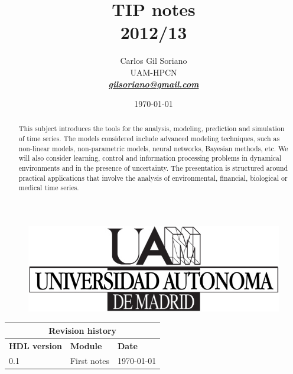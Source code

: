 \documentclass[a4paper,11pt]{article}
\begin{document}
\title{\textbf{{\LARGE TIP notes \\2012/13}}}
\author{Carlos Gil Soriano\\UAM-HPCN\\
\href{mailto:gilsoriano@gmail.com}{\textbf{\textit{gilsoriano@gmail.com}}}}
\date{\today}
\maketitle
\thispagestyle{empty}
\begin{figure}[htb]
   \begin{center}
      \includegraphics[scale=1,
      keepaspectratio]{../../../figures/logo/logo-uam.jpg}
   \end{center}
\end{figure}

\begin{abstract}

  This subject introduces the tools for the analysis, modeling, prediction and
  simulation of time series. The models considered include advanced modeling
  techniques, such as non-linear models, non-parametric models, neural networks,
  Bayesian methods, etc. We will also consider learning, control and information
  processing problems in dynamical environments and in the presence of
  uncertainty. The presentation is structured around practical applications that
  involve the analysis of environmental, financial, biological or medical time
  series.

\end{abstract}

\vspace{2cm}
\begin{center}
\begin{tabular}{|p{2.5cm}|p{3.5cm}|p{3.5cm}|}
\hline
\multicolumn{3}{|c|}{\textbf{Revision history}}\\
\hline
\hline
\textbf{HDL version} & \textbf{Module} & \textbf{Date}\\
\hline
0.1 & First notes & \today\\
\hline
\end{tabular}
\end{center}
\end{document}
